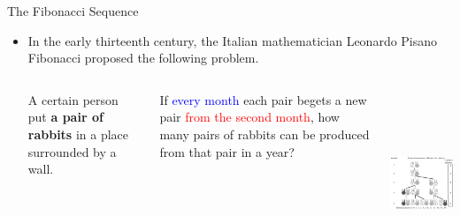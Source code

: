 \documentclass[aspectratio=169]{beamer}
\providecommand{\Blue}[1]{\textcolor{blue}{#1}}
\providecommand{\Red}[1]{\textcolor{red}{#1}}
\begin{document}
\begin{frame}[plain]{The Fibonacci Sequence}
 \begin{itemize}
  \item In the early thirteenth century, the Italian mathematician Leonardo Pisano Fibonacci
     proposed the following problem. 
    \begin{columns}[c]
         A certain person put {\bf a pair of rabbits} in a place surrounded by
          a wall.
          \medskip
          
          If \Blue{every month} each pair begets a new pair \Red{from the second month}, 
          how many pairs of rabbits can be produced from that pair in a year?
          
	\begin{center}
	      \includegraphics[height=5.5cm]{./img/lecture20-fig1.jpg}
	  \end{center}  
   \end{columns}
     
 \end{itemize}

\end{frame}
\end{document}
